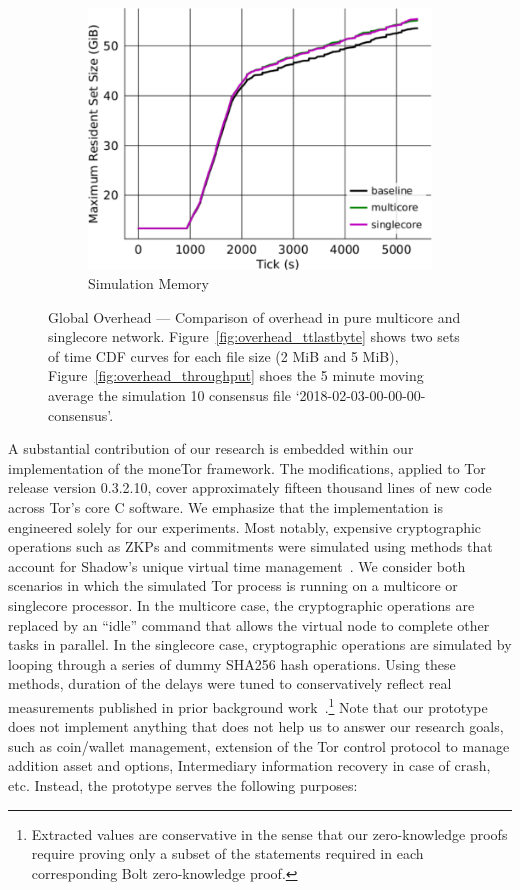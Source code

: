 \begin{figure}[t]
\begin{subfigure}[t]{0.32\textwidth}
    \includegraphics[clip, width=1.0\textwidth]{images/overhead_memory.pdf}
    \caption{Simulation Memory}
    \label{fig:overhead_shadow}
  \end{subfigure}
  \caption{Global Overhead --- Comparison of overhead in pure multicore and singlecore network.
    Figure~\ref{fig:overhead_ttlastbyte} shows two sets of time CDF curves for each file size (2 MiB and 5 MiB), Figure~\ref{fig:overhead_throughput} shoes the 5 minute moving average the simulation 10 consensus file `2018-02-03-00-00-00-consensus'.}
  \label{fig:overhead}
\end{figure}

A substantial contribution of our research is embedded within our implementation of the moneTor framework.
The modifications, applied to Tor release version 0.3.2.10, cover approximately fifteen thousand lines of new code across Tor's core C software.
We emphasize that the implementation is engineered solely for our experiments.
Most notably, expensive cryptographic operations such as ZKPs and commitments were simulated using methods that account for Shadow's unique virtual time management~\cite{jansen2011shadow}.
We consider both scenarios in which the simulated Tor process is running on a multicore or singlecore processor.
In the multicore case, the cryptographic operations are replaced by an ``idle'' command that allows the virtual node to complete other tasks in parallel.
In the singlecore case, cryptographic operations are simulated by looping through a series of dummy SHA256 hash operations.
Using these methods, duration of the delays were tuned to conservatively reflect real measurements published in prior background work~\cite{green2017bolt}.\footnote{Extracted values are conservative in the sense that our zero-knowledge proofs require proving only a subset of the statements required in each corresponding Bolt zero-knowledge proof.}
Note that our prototype does not implement anything that does not help us to answer our research goals, such as coin/wallet management, extension of the Tor control protocol to manage addition asset and options, Intermediary information recovery in case of crash, etc.
Instead, the prototype serves the following purposes:

